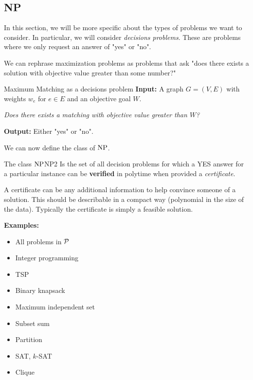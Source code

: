 \subsection{NP}
In this section, we will be more specific about the types of problems we want to consider.   In particular, we will consider \emph{decisions problems}.  These are problems where we only request an answer of "yes" or "no".

We can rephrase maximization problems as problems that ask "does there exists a solution with objective value greater than some number?"
\begin{example}{Maximum Matching as a decisions problem}{}
\textbf{Input:} A graph $G = (V,E)$ with weights $w_e$ for $e \in E$ and an objective goal $W$.

\begin{center}
\emph{
Does there exists a matching with objective value greater than $W$?}
\end{center}

\textbf{Output:} Either "yes" or "no".
\end{example}


We can now define the class of $\mbox{NP}$.  
	
\begin{definition}{The class $\mbox{NP}$}{NP2}
Is the set of all decision problems for which a YES answer for a  
particular instance can be {\bf verified} in polytime when provided a \emph{certificate}.

A certificate can be any additional information to help convince someone of a solution.  This should be describable in a compact way (polynomial in the size of the data).  Typically the certificate is simply a feasible solution.
\end{definition}
	
	{\bf Examples:}

\begin{multicols}{2}
\begin{itemize}
\item All problems in ${\mathcal{P}}$
\item Integer programming
\item TSP
\item Binary knapsack
\item Maximum independent set
\item Subset sum
\item Partition
\item SAT, $k$-SAT
\item Clique
\end{itemize}
\end{multicols}


